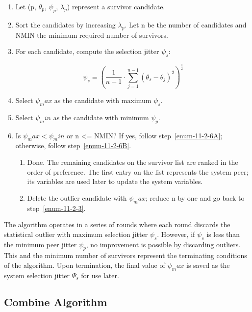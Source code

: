 \begin{enumerate}
  \item Let (p, $ \theta_p $, $ \psi_p $, $ \lambda_p $) represent a survivor candidate.

  \item Sort the candidates by increasing $ \lambda_p $.  Let n be the number
    of candidates and NMIN the minimum required number of survivors.

  \item \label{enum-11-2-3} For each candidate, compute the selection jitter $ \psi_s $:

    $$
    \psi_s = \left( \frac{1}{n - 1} \cdot \sum^{n - 1}_{j = 1} (\theta_s - \theta_j)^2 \right)^{\frac{1}{2}}
    $$

  \item Select $ \psi_max $ as the candidate with maximum $ \psi_s $.
  \item Select $ \psi_min $ as the candidate with minimum $ \psi_p $.

  \item \label{enum-11-2-6} Is $ \psi_max < \psi_min $ or n <= NMIN?  If yes, follow step~\ref{enum-11-2-6A};
    otherwise, follow step~\ref{enum-11-2-6B}.

    \begin{enumerate}
      \item \label{enum-11-2-6A} Done. The remaining candidates on the survivor list are ranked
      in the order of preference.  The first entry on the list represents
      the system peer; its variables are used later to update the system
      variables.

      \item \label{enum-11-2-6B} Delete the outlier candidate with $ \psi_max $; reduce n by one and go
      back to step~\ref{enum-11-2-3}.
    \end{enumerate}
\end{enumerate}

The algorithm operates in a series of rounds where each round
discards the statistical outlier with maximum selection jitter $ \psi_s $.
However, if $ \psi_s $ is less than the minimum peer jitter $ \psi_p $, no
improvement is possible by discarding outliers.  This and the minimum
number of survivors represent the terminating conditions of the
algorithm.  Upon termination, the final value of $ \psi_max $ is saved as
the system selection jitter $ \Psi_s $ for use later.

\subsection{Combine Algorithm}
\label{section-11-2-3}

